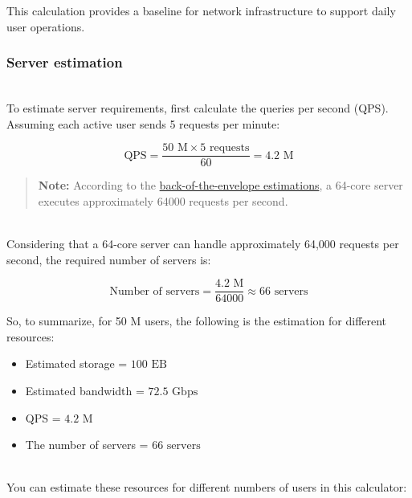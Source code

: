 This calculation provides a baseline for network infrastructure to support daily user operations.

\subsubsection{Server estimation}\label{GLgXog-otuOLzfgmHhhoe}
\\
To estimate server requirements, first calculate the queries per second (QPS). Assuming each active user sends 5 requests per minute:

\[
\text{QPS} = \frac{50 \text{ M} \times 5 \text{ requests}}{60} = 4.2 \text{ M}
\]

\begin{quote}
\textbf{Note:} According to the \href{https://www.educative.io/blog/back-of-envelope-estimation-system-design-interview}{back-of-the-envelope estimations}, a 64-core server executes approximately 64000 requests per second.
\end{quote}
\\
Considering that a 64-core server can handle approximately 64,000 requests per second, the required number of servers is:

\[
\text{Number of servers} = \frac{4.2 \text{ M}}{64000} \approx 66 \text{ servers}
\]

So, to summarize, for 50 M users, the following is the estimation for different resources:

\begin{itemize}
\item
\protect{}\label{9PQcS3uvJa1YRm6I2DBuj}
Estimated storage = \protect{}\label{katex_inline_lrNacJYwOXKAWHhBRezRw}{{{\(100 \text{ EB}\)}}}
\item
\protect{}\label{m_QJLaulc7GKRK752PPJz}
Estimated bandwidth = \protect{}\label{katex_inline_qmcE7k5WeZeY_hxHb48Qa}{{{\(72.5 \textrm{ Gbps}\)}}}
\item
\protect{}\label{5yE-I021HmryrCXau91KA}
QPS = \protect{}\label{katex_inline_C9gcRit0kr0SLSB2AKNYl}{{{\(4.2\text{ M}\)}}}
\item
\protect{}\label{jWv_sTuQa0PWUfqgs2VRf}
The number of servers = \protect{}\label{katex_inline_k4vljrxHmM9CfcSKA9saJ}{{{\(66 \text{ servers}\)}}}
\end{itemize}
\\
You can estimate these resources for different numbers of users in this calculator:

